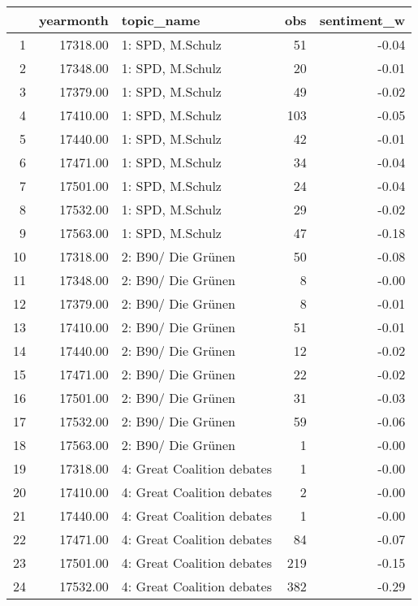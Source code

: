 \begin{table}[ht]
\centering
\begin{tabular}{rrlrr}
  \hline
 & yearmonth & topic\_name & obs & sentiment\_w \\ 
  \hline
1 & 17318.00 & 1: SPD, M.Schulz &  51 & -0.04 \\ 
  2 & 17348.00 & 1: SPD, M.Schulz &  20 & -0.01 \\ 
  3 & 17379.00 & 1: SPD, M.Schulz &  49 & -0.02 \\ 
  4 & 17410.00 & 1: SPD, M.Schulz & 103 & -0.05 \\ 
  5 & 17440.00 & 1: SPD, M.Schulz &  42 & -0.01 \\ 
  6 & 17471.00 & 1: SPD, M.Schulz &  34 & -0.04 \\ 
  7 & 17501.00 & 1: SPD, M.Schulz &  24 & -0.04 \\ 
  8 & 17532.00 & 1: SPD, M.Schulz &  29 & -0.02 \\ 
  9 & 17563.00 & 1: SPD, M.Schulz &  47 & -0.18 \\ 
  10 & 17318.00 & 2: B90/ Die Grünen &  50 & -0.08 \\ 
  11 & 17348.00 & 2: B90/ Die Grünen &   8 & -0.00 \\ 
  12 & 17379.00 & 2: B90/ Die Grünen &   8 & -0.01 \\ 
  13 & 17410.00 & 2: B90/ Die Grünen &  51 & -0.01 \\ 
  14 & 17440.00 & 2: B90/ Die Grünen &  12 & -0.02 \\ 
  15 & 17471.00 & 2: B90/ Die Grünen &  22 & -0.02 \\ 
  16 & 17501.00 & 2: B90/ Die Grünen &  31 & -0.03 \\ 
  17 & 17532.00 & 2: B90/ Die Grünen &  59 & -0.06 \\ 
  18 & 17563.00 & 2: B90/ Die Grünen &   1 & -0.00 \\ 
  19 & 17318.00 & 4: Great Coalition debates &   1 & -0.00 \\ 
  20 & 17410.00 & 4: Great Coalition debates &   2 & -0.00 \\ 
  21 & 17440.00 & 4: Great Coalition debates &   1 & -0.00 \\ 
  22 & 17471.00 & 4: Great Coalition debates &  84 & -0.07 \\ 
  23 & 17501.00 & 4: Great Coalition debates & 219 & -0.15 \\ 
  24 & 17532.00 & 4: Great Coalition debates & 382 & -0.29 \\ 

\end{tabular}
\end{table}

